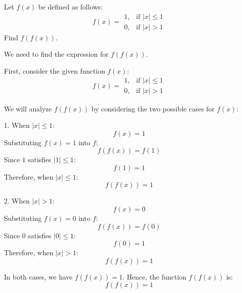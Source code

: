 \begin{solution}
\begin{center}
\end{center}

\end{solution}

\begin{exercise}
Let \( f(x) \) be defined as follows:
\[
f(x) =
\begin{array}{ll}
1, & \text{if } |x| \leq 1 \\
0, & \text{if } |x| > 1
\end{array}
\]
Find \( f(f(x)) \).
\end{exercise}
\begin{solution}
We need to find the expression for \( f(f(x)) \).

First, consider the given function \( f(x) \):
\[
f(x) =
\begin{array}{ll}
1, & \text{if } |x| \leq 1 \\
0, & \text{if } |x| > 1
\end{array}
\]

We will analyze \( f(f(x)) \) by considering the two possible cases for \( f(x) \):

1. When \( |x| \leq 1 \):
   \[
   f(x) = 1
   \]
   Substituting \( f(x) = 1 \) into \( f \):
   \[
   f(f(x)) = f(1)
   \]
   Since \( 1 \) satisfies \( |1| \leq 1 \):
   \[
   f(1) = 1
   \]
   Therefore, when \( |x| \leq 1 \):
   \[
   f(f(x)) = 1
   \]

2. When \( |x| > 1 \):
   \[
   f(x) = 0
   \]
   Substituting \( f(x) = 0 \) into \( f \):
   \[
   f(f(x)) = f(0)
   \]
   Since \( 0 \) satisfies \( |0| \leq 1 \):
   \[
   f(0) = 1
   \]
   Therefore, when \( |x| > 1 \):
   \[
   f(f(x)) = 1
   \]

In both cases, we have \( f(f(x)) = 1 \). Hence, the function \( f(f(x)) \) is:
\[
f(f(x)) = 1
\]

\end{solution}

